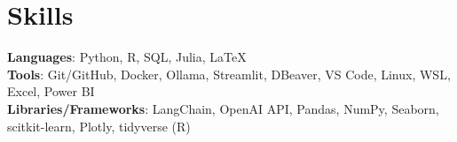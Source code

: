 \documentclass[letterpaper,11pt]{article}
\makeatletter
\newcommand{\resumeItem}[1]{
  \item\small{
    {#1 \vspace{-2pt}}
  }
}
\newcommand{\resumeSubheading}[4]{
  \vspace{-2pt}\item
    \begin{tabular*}{1.0\textwidth}[t]{l@{\extracolsep{\fill}}r}
      \textbf{#1} & \small #2 \\
      \textit{\small#3} & \textit{\small #4} \\
    \end{tabular*}\vspace{-7pt}
}
\newcommand{\resumeSubHeadingListStart}{\begin{itemize}[leftmargin=0.0in, label={}]}
\newcommand{\resumeSubHeadingListEnd}{\end{itemize}}
\newcommand{\resumeItemListStart}{\begin{itemize}}
\newcommand{\resumeItemListEnd}{\end{itemize}\vspace{-5pt}}
\makeatother
\begin{document}
\section{Skills}
  \begin{itemize}[leftmargin=0.15in, label={}]
      \small{\item{
      \textbf{Languages}{: Python, R, SQL, Julia, \LaTeX} \\
      \textbf{Tools}{: Git/GitHub, Docker, Ollama, Streamlit, DBeaver, VS Code, Linux, WSL, Excel, Power BI} \\
      \textbf{Libraries/Frameworks}{: LangChain, OpenAI API, Pandas, NumPy, Seaborn, scitkit-learn, Plotly, tidyverse (R)}  \\
      }}
  \end{itemize} 

\end{document}
